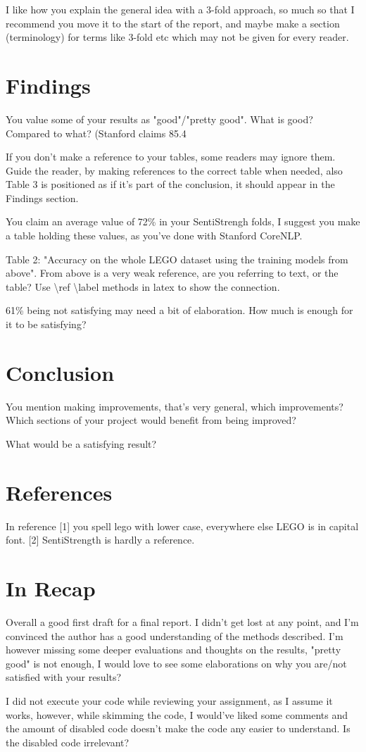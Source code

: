\documentclass[11pt]{article} %
\begin{document}
I like how you explain the general idea with a 3-fold approach, so much so that I recommend you move it to the start of the report, and maybe make a section (terminology) for terms like 3-fold etc which may not be given for every reader. 

\section*{Findings}
You value some of your results as "good"/"pretty good". What is good? Compared to what? (Stanford claims 85.4%

If you don't make a reference to your tables, some readers may ignore them. Guide the reader, by making references to the correct table when needed, also Table 3 is positioned as if it's part of the conclusion, it should appear in the Findings section.

You claim an average value of 72\% in your SentiStrengh folds, I suggest you make a table holding these values, as you've done with Stanford CoreNLP.

Table 2: "Accuracy on the whole LEGO dataset using the training models from above". From above is a very weak reference, are you referring to text, or the table? Use \textbackslash ref \textbackslash label methods in latex to show the connection.

61\% being not satisfying may need a bit of elaboration. How much is enough for it to be satisfying?

\section*{Conclusion}
You mention making improvements, that's very general, which improvements? Which sections of your project would benefit from being improved?

What would be a satisfying result?

\section*{References}
In reference [1] you spell lego with lower case, everywhere else LEGO is in capital font.
[2] SentiStrength is hardly a reference.
\section*{In Recap}
Overall a good first draft for a final report. I didn't get lost at any point, and I'm convinced the author has a good understanding of the methods described. I'm however missing some deeper evaluations and thoughts on the results, "pretty good" is not enough, I would love to see some elaborations on why you are/not satisfied with your results?

I did not execute your code while reviewing your assignment, as I assume it works, however, while skimming the code, I would've liked some comments and the amount of disabled code doesn't make the code any easier to understand. Is the disabled code irrelevant?
\end{document}
